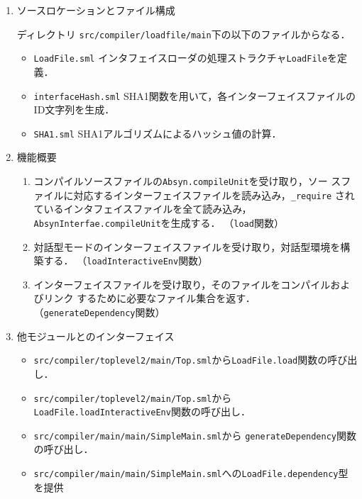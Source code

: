 \documentclass{jbook}
\newcommand{\code}[1]{\mbox{\large\tt #1}}
\begin{document}
\ifjp%
\begin{enumerate}
\item ソースロケーションとファイル構成

ディレクトリ \code{src/compiler/loadfile/main}下の以下のファイルからなる．
\begin{itemize}
\item \code{LoadFile.sml} インタフェイスローダの処理ストラクチャ\code{LoadFile}を定義．
\item \code{interfaceHash.sml} SHA1関数を用いて，各インターフェイスファイルのID文字列を生成．
\item \code{SHA1.sml} SHA1アルゴリズムによるハッシュ値の計算．
\end{itemize}

\item 機能概要 
\begin{enumerate}
\item 
コンパイルソースファイルの\code{Absyn.compileUnit}を受け取り，ソー
スファイルに対応するインターフェイスファイルを読み込み，\code{\_require}
されているインタフェイスファイルを全て読み込み，
\code{AbsynInterfae.compileUnit}を生成する．
（\code{load}関数）
\item 
対話型モードのインターフェイスファイルを受け取り，対話型環境を構築する．
（\code{loadInteractiveEnv}関数）
\item 
インターフェイスファイルを受け取り，そのファイルをコンパイルおよびリンク
するために必要なファイル集合を返す．
（\code{generateDependency}関数）
\end{enumerate}
\item 他モジュールとのインターフェイス
\begin{itemize}
\item 
\code{src/compiler/toplevel2/main/Top.sml}から\code{LoadFile.load}関数の呼び出し．
\item 
\code{src/compiler/toplevel2/main/Top.sml}から\code{LoadFile.loadInteractiveEnv}関数の呼び出し．
\item 
\code{src/compiler/main/main/SimpleMain.sml}から
\code{generateDependency}関数の呼び出し．
\item \code{src/compiler/main/main/SimpleMain.sml}への\code{LoadFile.dependency}型を提供
\end{itemize}
\end{enumerate}
\else%
\fi%
\end{document}
